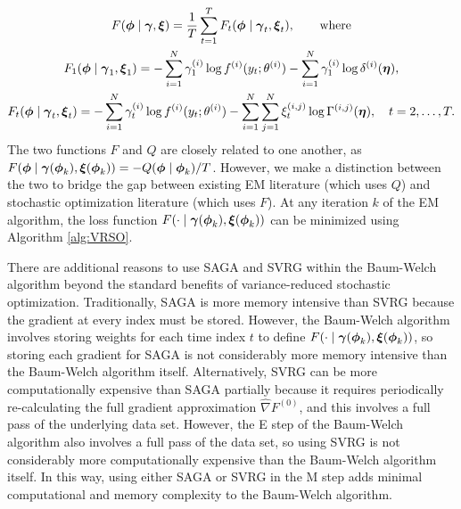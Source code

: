 \begin{gather}
    F(\boldsymbol{\phi} \mid \boldsymbol{\gamma}, \boldsymbol{\xi}) = \frac{1}{T}\sum_{t=1}^T F_t(\boldsymbol{\phi} \mid \boldsymbol{\gamma}_t , \boldsymbol{\xi}_t), \qquad \text{where} \label{eqn:F}\\
    F_1(\boldsymbol{\phi} \mid \boldsymbol{\gamma}_1,\boldsymbol{\xi}_1) = - \sum_{i=1}^N \gamma^{(i)}_1 \log f^{(i)}(y_t;\theta^{(i)}) - \sum_{i=1}^N \gamma^{(i)}_1 \log \delta^{(i)}(\boldsymbol{\eta}), \label{eqn:F_1} \\
    F_t(\boldsymbol{\phi} \mid \boldsymbol{\gamma}_t , \boldsymbol{\xi}_t) = - \sum_{i=1}^N \gamma^{(i)}_t \log f^{(i)}(y_t;\theta^{(i)}) - \sum_{i=1}^N \sum_{j=1}^N \xi^{(i,j)}_t \log \Gamma^{(i,j)}(\boldsymbol{\eta}), \quad t = 2, \ldots, T. \label{eqn:F_t}
\end{gather}
%
%
The two functions $F$ and $Q$ are closely related to one another, as $F(\boldsymbol{\phi} \mid \boldsymbol{\gamma}(\boldsymbol{\phi}_k), \boldsymbol{\xi}(\boldsymbol{\phi}_k)) = - Q(\boldsymbol{\phi} \mid \boldsymbol{\phi}_k) / T$. However, we make a distinction between the two to bridge the gap between existing EM literature (which uses $Q$) and stochastic optimization literature (which uses $F$). At any iteration $k$ of the EM algorithm, the loss function $F(\cdot \mid \boldsymbol{\gamma}(\boldsymbol{\phi}_k),\boldsymbol{\xi}(\boldsymbol{\phi}_k))$ can be minimized using Algorithm \ref{alg:VRSO}. %

There are additional reasons to use SAGA and SVRG within the Baum-Welch algorithm beyond the standard benefits of variance-reduced stochastic optimization. Traditionally, SAGA is more memory intensive than SVRG because the gradient at every index must be stored. However, the Baum-Welch algorithm involves storing weights for each time index $t$ to define $F(\cdot \mid \boldsymbol{\gamma}(\boldsymbol{\phi}_k), \boldsymbol{\xi}(\boldsymbol{\phi}_k))$, so storing each gradient for SAGA is not considerably more memory intensive than the Baum-Welch algorithm itself. Alternatively, SVRG can be more computationally expensive than SAGA partially because it requires periodically re-calculating the full gradient approximation $\widehat \nabla F^{(0)}$, and this involves a full pass of the underlying data set. However, the E step of the Baum-Welch algorithm also involves a full pass of the data set, so using SVRG is not considerably more computationally expensive than the Baum-Welch algorithm itself. In this way, using either SAGA or SVRG in the M step adds minimal computational and memory complexity to the Baum-Welch algorithm.

